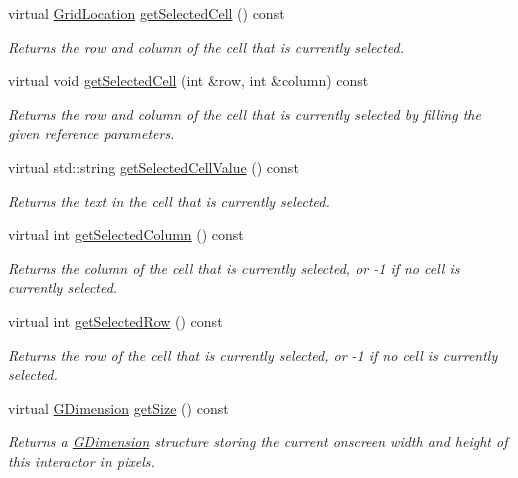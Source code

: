 \begin{DoxyCompactItemize}
virtual \mbox{\hyperlink{structGridLocation}{Grid\+Location}} \mbox{\hyperlink{classGTable_ae4b79399eefc964f783f06b6959a6a4a}{get\+Selected\+Cell}} () const
\begin{DoxyCompactList}\small\item\em Returns the row and column of the cell that is currently selected. \end{DoxyCompactList}\item 
virtual void \mbox{\hyperlink{classGTable_a29b4e2e079037922545996e08f7ce6c4}{get\+Selected\+Cell}} (int \&row, int \&column) const
\begin{DoxyCompactList}\small\item\em Returns the row and column of the cell that is currently selected by filling the given reference parameters. \end{DoxyCompactList}\item 
virtual std\+::string \mbox{\hyperlink{classGTable_a8963c035a687a8393cd1f56ae05f582e}{get\+Selected\+Cell\+Value}} () const
\begin{DoxyCompactList}\small\item\em Returns the text in the cell that is currently selected. \end{DoxyCompactList}\item 
virtual int \mbox{\hyperlink{classGTable_abeec6fda3c331aa187ba1b695b19d435}{get\+Selected\+Column}} () const
\begin{DoxyCompactList}\small\item\em Returns the column of the cell that is currently selected, or -\/1 if no cell is currently selected. \end{DoxyCompactList}\item 
virtual int \mbox{\hyperlink{classGTable_adeb0b39683825191a8216d6cc3ca5072}{get\+Selected\+Row}} () const
\begin{DoxyCompactList}\small\item\em Returns the row of the cell that is currently selected, or -\/1 if no cell is currently selected. \end{DoxyCompactList}\item 
virtual \mbox{\hyperlink{classGDimension}{G\+Dimension}} \mbox{\hyperlink{classGInteractor_a7b4eec96a2bdc6420695d5796a78eea9}{get\+Size}} () const
\begin{DoxyCompactList}\small\item\em Returns a \mbox{\hyperlink{classGDimension}{G\+Dimension}} structure storing the current onscreen width and height of this interactor in pixels. \end{DoxyCompactList}\item 

\end{DoxyCompactItemize}
